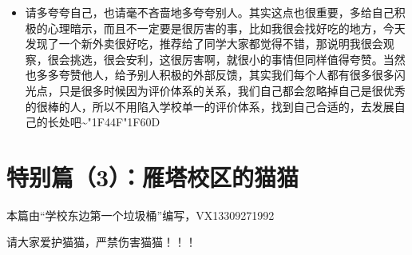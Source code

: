\documentclass[zihao=-4,fontset=none]{Beautybook-CN}
\begin{document}
\begin{itemize}
\item 请多夸夸自己，也请毫不吝啬地多夸夸别人。其实这点也很重要，多给自己积极的心理暗示，而且不一定要是很厉害的事，比如我很会找好吃的地方，今天发现了一个新外卖很好吃，推荐给了同学大家都觉得不错，那说明我很会观察，很会挑选，很会安利，这很厉害啊，就很小的事情但同样值得夸赞。当然也多多夸赞他人，给予别人积极的外部反馈，其实我们每个人都有很多很多闪光点，只是很多时候因为评价体系的关系，我们自己都会忽略掉自己是很优秀的很棒的人，所以不用陷入学校单一的评价体系，找到自己合适的，去发展自己的长处吧\textasciitilde{}{\char"1F44F}{\char"1F60D}
\end{itemize}
\chapter{特别篇（3）：雁塔校区的猫猫}
\begin{example}
    本篇由“学校东边第一个垃圾桶”编写，VX13309271992
\end{example}
\begin{theorem}
    请大家爱护猫猫，严禁伤害猫猫！！！
\end{theorem}
\end{document}
